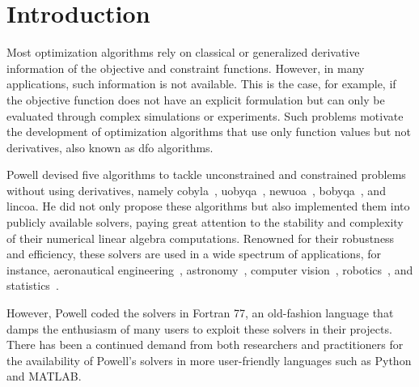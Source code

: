 \documentclass[manuscript,screen,review]{acmart}
\numberwithin{equation}{section}
\begin{document}


\received{\today}

\maketitle

\section{Introduction}

Most optimization algorithms rely on classical or generalized derivative information of the objective and constraint functions.
However, in many applications, such information is not available.
This is the case, for example, if the objective function does not have an explicit formulation but can only be evaluated through complex simulations or experiments.
Such problems motivate the development of optimization algorithms that use only function values but not derivatives, also known as \gls{dfo} algorithms.

Powell devised five algorithms to tackle unconstrained and constrained problems without using derivatives, namely \gls{cobyla}~\cite{Powell_1994}, \gls{uobyqa}~\cite{Powell_2002}, \gls{newuoa}~\cite{Powell_2006}, \gls{bobyqa}~\cite{Powell_2009}, and \gls{lincoa}.
He did not only propose these algorithms but also implemented them into publicly available solvers, paying great attention to the stability and complexity of their numerical linear algebra computations.
Renowned for their robustness and efficiency, these solvers are used in a wide spectrum of applications, for instance, aeronautical engineering~\cite{Gallard_Etal_2018}, astronomy~\cite{Mamon_Biviano_Boue_2013}, computer vision~\cite{Izadinia_Shan_Seitz_2017}, robotics~\cite{Mombaur_Truong_Laumond_2010}, and statistics~\cite{Bates_Etal_2015}.

However, Powell coded the solvers in Fortran 77, an old-fashion language that damps the enthusiasm of many users to exploit these solvers in their projects.
There has been a continued demand from both researchers and practitioners for the availability of Powell's solvers in more user-friendly languages such as Python and MATLAB.
\end{document}
